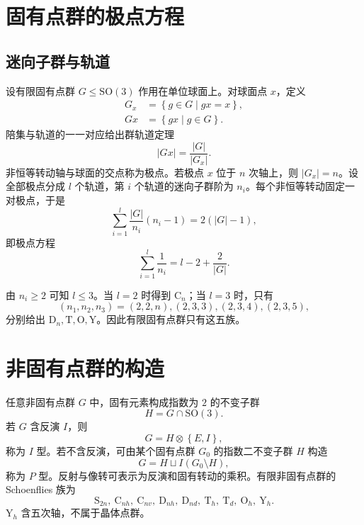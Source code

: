 \section{固有点群的极点方程}
\subsection{迷向子群与轨道}
设有限固有点群 $G\leq\mathrm{SO}\left(3\right)$ 作用在单位球面上。对球面点 $x$，定义
\begin{align}
G_x&=\left\{g\in G\mid gx=x\right\},\\
Gx&=\left\{gx\mid g\in G\right\}.
\end{align}
陪集与轨道的一一对应给出群轨道定理
\begin{equation}
\left|Gx\right|=\frac{\left|G\right|}{\left|G_x\right|}.
\end{equation}
非恒等转动轴与球面的交点称为极点。若极点 $x$ 位于 $n$ 次轴上，则 $\left|G_x\right|=n$。设全部极点分成 $l$ 个轨道，第 $i$ 个轨道的迷向子群阶为 $n_i$。每个非恒等转动固定一对极点，于是
\begin{equation}
\sum_{i=1}^{l}\frac{\left|G\right|}{n_i}\left(n_i-1\right)=2\left(\left|G\right|-1\right),
\end{equation}
即极点方程
\begin{equation}
\sum_{i=1}^{l}\frac{1}{n_i}=l-2+\frac{2}{\left|G\right|}.
\end{equation}

由 $n_i\geqslant2$ 可知 $l\leqslant3$。当 $l=2$ 时得到 $\mathrm{C}_n$；当 $l=3$ 时，只有
\begin{equation}
\left(n_1,n_2,n_3\right)=\left(2,2,n\right),\left(2,3,3\right),\left(2,3,4\right),\left(2,3,5\right),
\end{equation}
分别给出 $\mathrm{D}_n,\mathrm{T},\mathrm{O},\mathrm{Y}$。因此有限固有点群只有这五族。

\section{非固有点群的构造}
任意非固有点群 $G$ 中，固有元素构成指数为 $2$ 的不变子群
\begin{equation}
H=G\cap\mathrm{SO}\left(3\right).
\end{equation}
若 $G$ 含反演 $I$，则
\begin{equation}
G=H\otimes\left\{E,I\right\},
\end{equation}
称为 $I$ 型。若不含反演，可由某个固有点群 $G_0$ 的指数二不变子群 $H$ 构造
\begin{equation}
G=H\sqcup I\left(G_0\setminus H\right),
\end{equation}
称为 $P$ 型。反射与像转可表示为反演和固有转动的乘积。有限非固有点群的 Schoenflies 族为
\begin{equation}
\mathrm{S}_{2n},\ \mathrm{C}_{nh},\ \mathrm{C}_{nv},\ \mathrm{D}_{nh},\ \mathrm{D}_{nd},\ \mathrm{T}_h,\ \mathrm{T}_d,\ \mathrm{O}_h,\ \mathrm{Y}_h.
\end{equation}
$\mathrm{Y}_h$ 含五次轴，不属于晶体点群。

